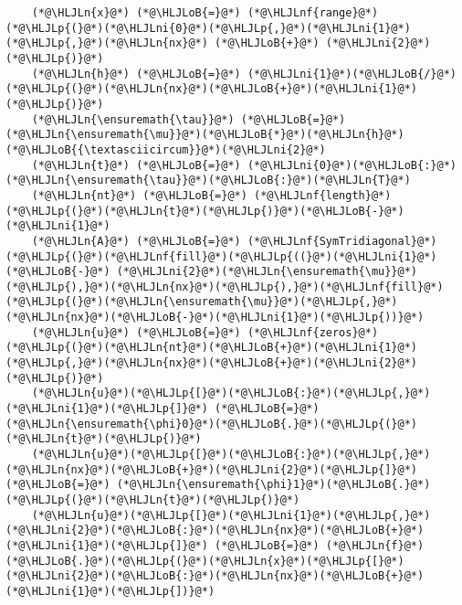 \documentclass[12pt,landscape]{article}
\newcommand{\HLJLn}[1]{#1}
\newcommand{\HLJLnf}[1]{\textcolor[RGB]{66,102,213}{#1}}
\newcommand{\HLJLni}[1]{\textcolor[RGB]{59,151,46}{#1}}
\newcommand{\HLJLoB}[1]{\textcolor[RGB]{102,102,102}{\textbf{#1}}}
\newcommand{\HLJLp}[1]{#1}
\begin{document}
{\begin{lstlisting}
    (*@\HLJLn{x}@*) (*@\HLJLoB{=}@*) (*@\HLJLnf{range}@*)(*@\HLJLp{(}@*)(*@\HLJLni{0}@*)(*@\HLJLp{,}@*)(*@\HLJLni{1}@*)(*@\HLJLp{,}@*)(*@\HLJLn{nx}@*) (*@\HLJLoB{+}@*) (*@\HLJLni{2}@*)(*@\HLJLp{)}@*)
    (*@\HLJLn{h}@*) (*@\HLJLoB{=}@*) (*@\HLJLni{1}@*)(*@\HLJLoB{/}@*)(*@\HLJLp{(}@*)(*@\HLJLn{nx}@*)(*@\HLJLoB{+}@*)(*@\HLJLni{1}@*)(*@\HLJLp{)}@*)
    (*@\HLJLn{\ensuremath{\tau}}@*) (*@\HLJLoB{=}@*) (*@\HLJLn{\ensuremath{\mu}}@*)(*@\HLJLoB{*}@*)(*@\HLJLn{h}@*)(*@\HLJLoB{{\textasciicircum}}@*)(*@\HLJLni{2}@*)
    (*@\HLJLn{t}@*) (*@\HLJLoB{=}@*) (*@\HLJLni{0}@*)(*@\HLJLoB{:}@*)(*@\HLJLn{\ensuremath{\tau}}@*)(*@\HLJLoB{:}@*)(*@\HLJLn{T}@*)
    (*@\HLJLn{nt}@*) (*@\HLJLoB{=}@*) (*@\HLJLnf{length}@*)(*@\HLJLp{(}@*)(*@\HLJLn{t}@*)(*@\HLJLp{)}@*)(*@\HLJLoB{-}@*)(*@\HLJLni{1}@*)
    (*@\HLJLn{A}@*) (*@\HLJLoB{=}@*) (*@\HLJLnf{SymTridiagonal}@*)(*@\HLJLp{(}@*)(*@\HLJLnf{fill}@*)(*@\HLJLp{((}@*)(*@\HLJLni{1}@*) (*@\HLJLoB{-}@*) (*@\HLJLni{2}@*)(*@\HLJLn{\ensuremath{\mu}}@*)(*@\HLJLp{),}@*)(*@\HLJLn{nx}@*)(*@\HLJLp{),}@*)(*@\HLJLnf{fill}@*)(*@\HLJLp{(}@*)(*@\HLJLn{\ensuremath{\mu}}@*)(*@\HLJLp{,}@*)(*@\HLJLn{nx}@*)(*@\HLJLoB{-}@*)(*@\HLJLni{1}@*)(*@\HLJLp{))}@*)
    (*@\HLJLn{u}@*) (*@\HLJLoB{=}@*) (*@\HLJLnf{zeros}@*)(*@\HLJLp{(}@*)(*@\HLJLn{nt}@*)(*@\HLJLoB{+}@*)(*@\HLJLni{1}@*)(*@\HLJLp{,}@*)(*@\HLJLn{nx}@*)(*@\HLJLoB{+}@*)(*@\HLJLni{2}@*)(*@\HLJLp{)}@*)
    (*@\HLJLn{u}@*)(*@\HLJLp{[}@*)(*@\HLJLoB{:}@*)(*@\HLJLp{,}@*)(*@\HLJLni{1}@*)(*@\HLJLp{]}@*) (*@\HLJLoB{=}@*) (*@\HLJLn{\ensuremath{\phi}0}@*)(*@\HLJLoB{.}@*)(*@\HLJLp{(}@*)(*@\HLJLn{t}@*)(*@\HLJLp{)}@*)
    (*@\HLJLn{u}@*)(*@\HLJLp{[}@*)(*@\HLJLoB{:}@*)(*@\HLJLp{,}@*)(*@\HLJLn{nx}@*)(*@\HLJLoB{+}@*)(*@\HLJLni{2}@*)(*@\HLJLp{]}@*) (*@\HLJLoB{=}@*) (*@\HLJLn{\ensuremath{\phi}1}@*)(*@\HLJLoB{.}@*)(*@\HLJLp{(}@*)(*@\HLJLn{t}@*)(*@\HLJLp{)}@*)
    (*@\HLJLn{u}@*)(*@\HLJLp{[}@*)(*@\HLJLni{1}@*)(*@\HLJLp{,}@*)(*@\HLJLni{2}@*)(*@\HLJLoB{:}@*)(*@\HLJLn{nx}@*)(*@\HLJLoB{+}@*)(*@\HLJLni{1}@*)(*@\HLJLp{]}@*) (*@\HLJLoB{=}@*) (*@\HLJLn{f}@*)(*@\HLJLoB{.}@*)(*@\HLJLp{(}@*)(*@\HLJLn{x}@*)(*@\HLJLp{[}@*)(*@\HLJLni{2}@*)(*@\HLJLoB{:}@*)(*@\HLJLn{nx}@*)(*@\HLJLoB{+}@*)(*@\HLJLni{1}@*)(*@\HLJLp{])}@*)


\end{lstlisting}}
\end{document}
